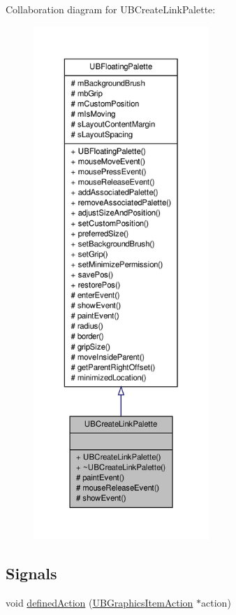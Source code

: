 Collaboration diagram for U\-B\-Create\-Link\-Palette\-:
\nopagebreak
\begin{figure}[H]
\begin{center}
\leavevmode
\includegraphics[height=550pt]{dc/db3/class_u_b_create_link_palette__coll__graph}
\end{center}
\end{figure}
\subsection*{Signals}
\begin{DoxyCompactItemize}
\item 
void \hyperlink{class_u_b_create_link_palette_af591c65b800cfb1face6a715ed1d0ab0}{defined\-Action} (\hyperlink{class_u_b_graphics_item_action}{U\-B\-Graphics\-Item\-Action} $\ast$action)
\end{DoxyCompactItemize}
